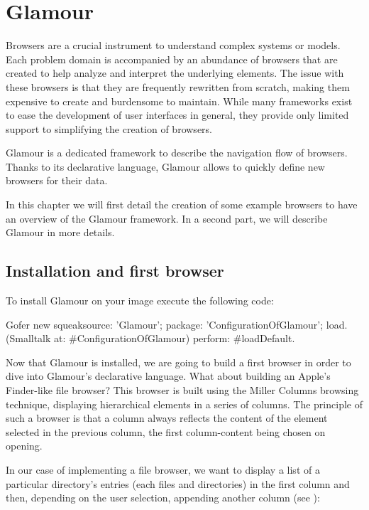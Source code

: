 \documentclass[a4paper,10pt,twoside]{book}
\begin{document}
\fi
\sloppy
\chapter{Glamour}
\label{glamour}

Browsers are a crucial instrument to understand complex systems or
models. Each problem domain is accompanied by an abundance of browsers
that are created to help analyze and interpret the underlying
elements. The issue with these browsers is that they are frequently
rewritten from scratch, making them expensive to create and burdensome
to maintain. While many frameworks exist to ease the development of
user interfaces in general, they provide only limited support to
simplifying the creation of browsers.

Glamour is a dedicated framework to describe the navigation flow
of browsers. Thanks to its declarative language, Glamour allows to
quickly define new browsers for their data.

In this chapter we will first detail the creation of some example
browsers to have an overview of the Glamour framework. In a second
part, we will describe Glamour in more details.

\section{Installation and first browser}

To install Glamour on your \pharo{} image execute the following code:

\begin{code}{}
Gofer new
  squeaksource: 'Glamour'; 
  package: 'ConfigurationOfGlamour';
  load.
(Smalltalk at: #ConfigurationOfGlamour)
  perform: #loadDefault.
\end{code}

Now that Glamour is installed, we are going to build a first browser
in order to dive into Glamour's declarative language. What about
building an Apple's Finder-like file browser? This browser is built
using the Miller Columns browsing technique, displaying hierarchical
elements in a series of columns. The principle of such a browser is
that a column always reflects the content of the element selected in
the previous column, the first column-content being chosen on opening.

In our case of implementing a file browser, we want to display a list
of a particular directory's entries (each files and directories) in
the first column and then, depending on the user selection, appending
another column (see ):
\end{document}
